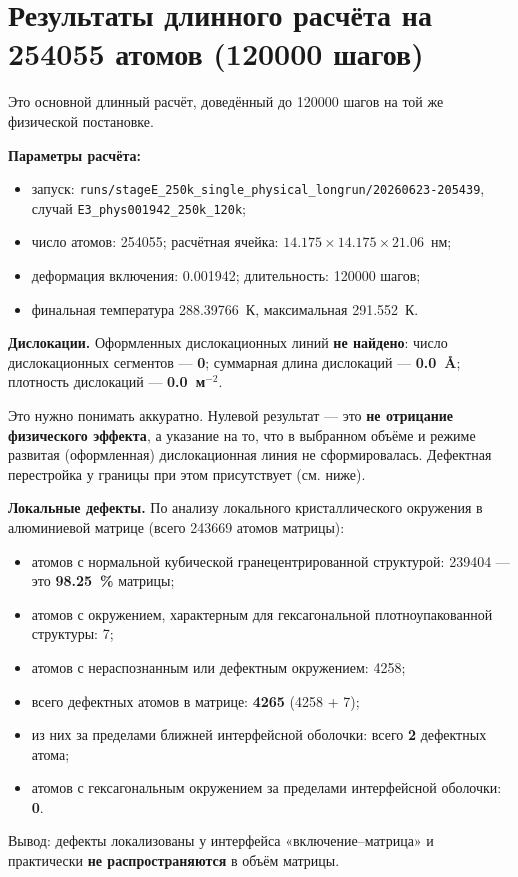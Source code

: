 \documentclass[12pt,a4paper]{extarticle}
\newcommand{\code}[1]{\texttt{#1}}
\begin{document}
\section{Результаты длинного расчёта на 254055 атомов (120000 шагов)}
Это основной длинный расчёт, доведённый до 120000 шагов на той же физической постановке.

\smallskip
\noindent\textbf{Параметры расчёта:}
\begin{itemize}[leftmargin=1.4em,itemsep=2pt,topsep=2pt]
\item запуск: \code{runs/stageE\_250k\_single\_physical\_longrun/20260623-205439}, случай \code{E3\_phys001942\_250k\_120k};
\item число атомов: 254055; расчётная ячейка: $14.175 \times 14.175 \times 21.06$~нм;
\item деформация включения: 0.001942; длительность: 120000 шагов;
\item финальная температура 288.39766~К, максимальная 291.552~К.
\end{itemize}

\smallskip
\noindent\textbf{Дислокации.} Оформленных дислокационных линий \textbf{не найдено}: число дислокационных сегментов — \textbf{0}; суммарная длина дислокаций — \textbf{0.0~Å}; плотность дислокаций — \textbf{0.0~м$^{-2}$}.

Это нужно понимать аккуратно. Нулевой результат — это \textbf{не отрицание физического эффекта}, а указание на то, что в выбранном объёме и режиме развитая (оформленная) дислокационная линия не сформировалась. Дефектная перестройка у границы при этом присутствует (см. ниже).

\smallskip
\noindent\textbf{Локальные дефекты.} По анализу локального кристаллического окружения в алюминиевой матрице (всего 243669 атомов матрицы):
\begin{itemize}[leftmargin=1.4em,itemsep=2pt,topsep=2pt]
\item атомов с нормальной кубической гранецентрированной структурой: 239404 — это \textbf{98.25~\%} матрицы;
\item атомов с окружением, характерным для гексагональной плотноупакованной структуры: 7;
\item атомов с нераспознанным или дефектным окружением: 4258;
\item всего дефектных атомов в матрице: \textbf{4265} (4258 + 7);
\item из них за пределами ближней интерфейсной оболочки: всего \textbf{2} дефектных атома;
\item атомов с гексагональным окружением за пределами интерфейсной оболочки: \textbf{0}.
\end{itemize}
Вывод: дефекты локализованы у интерфейса «включение--матрица» и практически \textbf{не распространяются} в объём матрицы.
\end{document}
